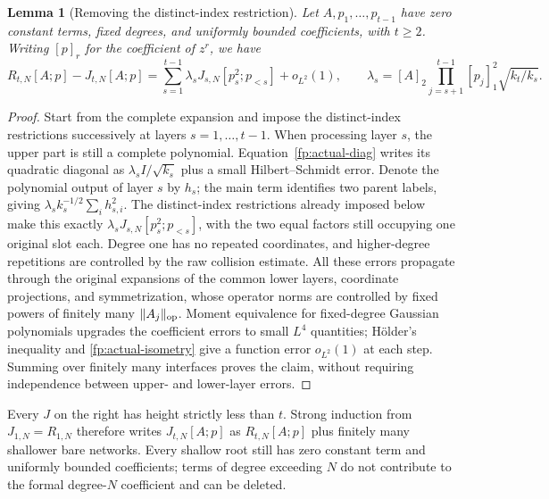 \documentclass[a4paper]{tufte-handout}
\newtheorem{lemma}{Lemma}
\begin{document}
\begin{fullwidth}
\begin{lemma}[Removing the distinct-index restriction]\label{fp:actual-restoration}
Let $A,p_1,\ldots,p_{t-1}$ have zero constant terms, fixed degrees, and uniformly bounded coefficients, with $t\ge2$.
Writing $[p]_r$ for the coefficient of $z^r$, we have
\begin{equation}\label{fp:actual-restoration-exact}
 R_{t,N}[A;p]-J_{t,N}[A;p]
 =\sum_{s=1}^{t-1}\lambda_sJ_{s,N}[p_s^2;p_{<s}]+o_{L^2}(1),
 \qquad
 \lambda_s=[A]_2\prod_{j=s+1}^{t-1}[p_j]_1^2\sqrt{k_t/k_s}.
\end{equation}
\end{lemma}
\begin{proof}
Start from the complete expansion and impose the distinct-index restrictions successively at layers $s=1,\ldots,t-1$.
When processing layer $s$, the upper part is still a complete polynomial.
Equation~\eqref{fp:actual-diag} writes its quadratic diagonal as $\lambda_sI/\sqrt{k_s}$ plus
a small Hilbert--Schmidt error. Denote the polynomial output of layer $s$ by $h_s$; the main term identifies two parent labels, giving
$\lambda_sk_s^{-1/2}\sum_i h_{s,i}^2$. The distinct-index restrictions already imposed below make this exactly
$\lambda_sJ_{s,N}[p_s^2;p_{<s}]$, with the two equal factors still occupying one original slot each.
Degree one has no repeated coordinates, and higher-degree repetitions are controlled by the raw collision estimate.
All these errors propagate through the original expansions of the common lower layers, coordinate projections, and symmetrization, whose operator norms are controlled by
fixed powers of finitely many $\|A_j\|_{\rm op}$.
Moment equivalence for fixed-degree Gaussian polynomials upgrades the coefficient errors to small $L^4$ quantities;
H\"older's inequality and \eqref{fp:actual-isometry} give a function error $o_{L^2}(1)$ at each step.
Summing over finitely many interfaces proves the claim, without requiring independence between upper- and lower-layer errors.
\end{proof}
Every $J$ on the right has height strictly less than $t$. Strong induction from $J_{1,N}=R_{1,N}$
therefore writes $J_{t,N}[A;p]$ as $R_{t,N}[A;p]$ plus finitely many shallower bare networks.
Every shallow root still has zero constant term and uniformly bounded coefficients; terms of degree exceeding $N$ do not contribute to the formal degree-$N$ coefficient and can be deleted.


\end{fullwidth}
\end{document}
